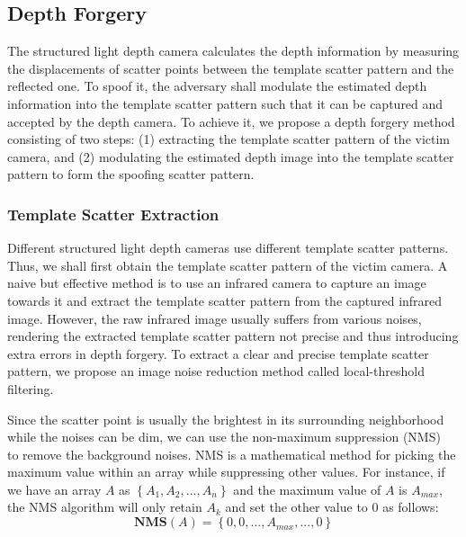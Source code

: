 \subsection{Depth Forgery}
The structured light depth camera calculates the depth information by measuring the displacements of scatter points between the template scatter pattern and the reflected one.  To spoof it, the adversary shall modulate the estimated depth information into the template scatter pattern such that it can be captured and accepted by the depth camera.  
To achieve it, we propose a depth forgery method consisting of two steps: (1) extracting the template scatter pattern of the victim camera, and (2) modulating the estimated depth image into the template scatter pattern to form the spoofing scatter pattern. 

\subsubsection{Template Scatter Extraction}
Different structured light depth cameras use different template scatter patterns. Thus, we shall first obtain the template scatter pattern of the victim camera. 
A naive but effective method is to use an infrared camera to capture an image towards it and extract the template scatter pattern from the captured infrared image. However, the raw infrared image usually suffers from various noises, rendering the extracted template scatter pattern not precise and thus  introducing extra errors in depth forgery. To extract a clear and precise template scatter pattern, we propose an image noise reduction method called local-threshold filtering. 

Since the scatter point is usually the brightest in its surrounding neighborhood while the noises can be dim, we can use the non-maximum suppression (NMS)~\cite{girshick2014rich} to remove the background noises. NMS is a mathematical method for picking the maximum value within an array while suppressing other values. For instance, if we have an array $A$ as $\left \{A_1, A_2, ...,A_n \right \}$ and the maximum value of $A$ is $A_{max}$, the NMS algorithm will only retain $A_k$ and set the other value to 0 as follows:
\begin{equation}
	\textbf{NMS}(A)=\left \{0, 0, ..., A_{max},...,0 \right \}\label{nms_1}
\end{equation}

